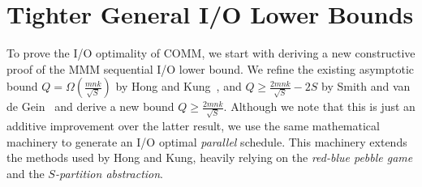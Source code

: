 \documentclass[sigplan,review,anonymous]{acmart}\settopmatter{printfolios=true,printccs=false,printacmref=false}
\newcommand\greg[1]{\textcolor{blue}{[Greg: #1]}}
\newcommand\mac[1]{\textcolor{red}{[Mac: #1]}}
\begin{document}
%

%




\section{Tighter General I/O Lower Bounds}
\label{sec:background}

To prove the I/O optimality of COMM, we start with deriving a new constructive 
proof 
of
the MMM sequential I/O lower bound. We refine the existing asymptotic bound $Q 
= \Omega(\frac{mnk}{\sqrt{S}})$ by Hong and
Kung~\cite{redblue}, and $Q \ge \frac{2mnk}{\sqrt{S}} - 2S$ by Smith and van de 
Gein~\cite{tightMMM} and derive a new bound $Q \ge \frac{2mnk}{\sqrt{S}}$. 
Although we note that this is just an additive improvement over the latter 
result, we use the same mathematical machinery to generate an I/O optimal 
\emph{parallel} schedule. This machinery extends the methods used by Hong and
Kung,  heavily relying on the \emph{red-blue
	pebble game} and the \emph{$S$-partition abstraction}. 
%
%
%
%
%
\end{document}
